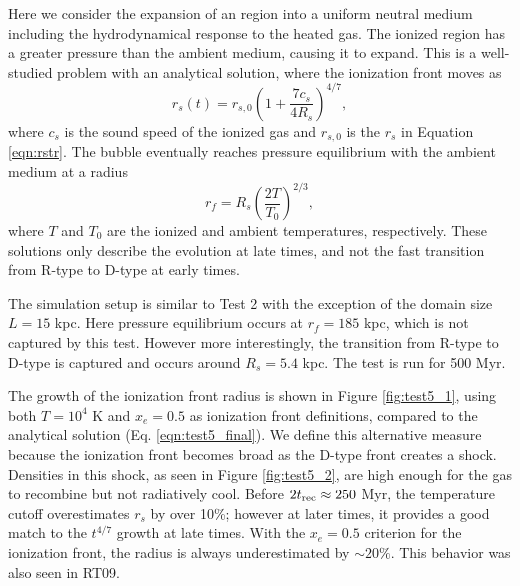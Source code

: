 \documentclass[useAMS,usenatbib]{mn2e}
\begin{document}
Here we consider the expansion of an \hii region into a uniform
neutral medium including the hydrodynamical response to the heated
gas.  The ionized region has a greater pressure than the ambient
medium, causing it to expand.  This is a well-studied problem
\citep{Spitzer78} with an analytical solution, where the ionization
front moves as
%
\begin{equation}
  \label{eqn:test5_r}
  r_s(t) = r_{s,0} \left(1 + \frac{7c_s}{4R_s}\right)^{4/7},
\end{equation}
where $c_s$ is the sound speed of the ionized gas and $r_{s,0}$ is the
$r_s$ in Equation \ref{eqn:rstr}.  The bubble eventually reaches
pressure equilibrium with the ambient medium at a radius
%
\begin{equation}
  \label{eqn:test5_final}
  r_f = R_s \left(\frac{2T}{T_0}\right)^{2/3},
\end{equation}
where $T$ and $T_0$ are the ionized and ambient temperatures,
respectively.  These solutions only describe the evolution at late
times, and not the fast transition from R-type to D-type at early
times.

The simulation setup is similar to Test 2 with the exception of the
domain size $L = 15$ kpc.  Here pressure equilibrium occurs at $r_f =
185$ kpc, which is not captured by this test.  However more
interestingly, the transition from R-type to D-type is captured and
occurs around $R_s = 5.4$ kpc.  The test is run for 500 Myr.

The growth of the ionization front radius is shown in Figure
\ref{fig:test5_1}, using both $T = 10^4$ K and $x_e = 0.5$ as
ionization front definitions, compared to the analytical solution
(Eq. \ref{eqn:test5_final}).  We define this alternative measure
because the ionization front becomes broad as the D-type front creates
a shock.  Densities in this shock, as seen in Figure
\ref{fig:test5_2}, are high enough for the gas to recombine but not
radiatively cool.  Before $2t_{\rm rec} \approx 250$ Myr, the
temperature cutoff overestimates $r_s$ by over 10\%; however at later
times, it provides a good match to the $t^{4/7}$ growth at late times.
With the $x_e = 0.5$ criterion for the ionization front, the radius is
always underestimated by $\sim20\%$.  This behavior was also seen in
RT09.
\end{document}
